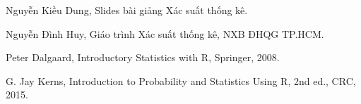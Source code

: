 
\newpage
{}
\renewcommand{\refname}{Tài liệu tham khảo}
\begin{thebibliography}{9}
    Nguyễn Kiều Dung, Slides bài giảng Xác suất thống kê.
    
    Nguyễn Đình Huy, Giáo trình Xác suất thống kê, NXB ĐHQG TP.HCM.
    
    Peter Dalgaard, Introductory Statistics with R, Springer, 2008.
    
    G. Jay Kerns, Introduction to Probability and Statistics Using R, 2nd ed., CRC, 2015.
    
\end{thebibliography}
